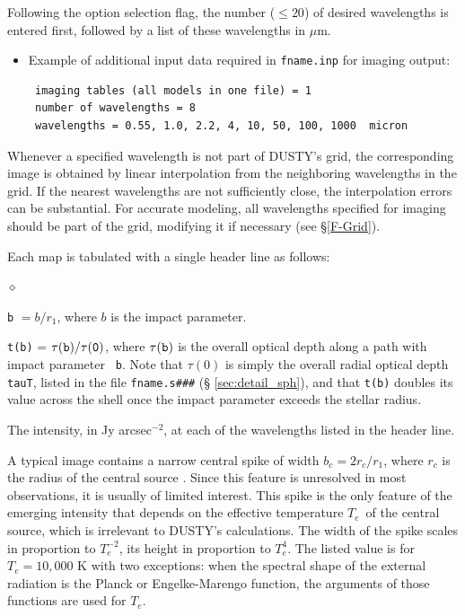 \documentclass[11pt]{article}
\def\D    {{\sf DUSTY}}
\def\mic    {\hbox{$\mu$m}}
\def\Te   {\hbox{$T_e$}}
\begin{document}
Following the option selection flag, the number ($\le 20$) of desired
wavelengths is entered first, followed by a list of these wavelengths
in \mic.

\begin{itemize}
\item Example of additional input data required in {\tt fname.inp} for
  imaging output:
\begin{verbatim}
 imaging tables (all models in one file) = 1
 number of wavelengths = 8
 wavelengths = 0.55, 1.0, 2.2, 4, 10, 50, 100, 1000  micron
\end{verbatim}
\end{itemize}
Whenever a specified wavelength is not part of \D's grid, the
corresponding image is obtained by linear interpolation from the
neighboring wavelengths in the grid.  If the nearest wavelengths are
not sufficiently close, the interpolation errors can be
substantial. For accurate modeling, all wavelengths specified for
imaging should be part of the grid, modifying it if necessary (see
\S\ref{F-Grid}).

Each map is tabulated with a single header line as follows:
\begin{list}{$\diamond$}{}
\item{\tt b} $= b/r_1$, where $b$ is the impact parameter.
\item {\tt t(b)} = $\tau(\tt b)/\tau(0)$, where $\tau(\tt b)$ is the
  overall optical depth along a path with impact parameter {\tt
    b}. Note that $\tau(0)$ is simply the overall radial optical depth
  {\tt tauT}, listed in the file {\tt fname.s\#\#\#} (\S
  \ref{sec:detail_sph}), and that {\tt t(b)} doubles its value across
  the shell once the impact parameter exceeds the stellar radius.
\item The intensity, in Jy arcsec$^{-2}$, at each of the wavelengths
  listed in the header line.
\end{list}

A typical image contains a narrow central spike of width $b_c =
2r_c/r_1$, where $r_c$ is the radius of the central source
\cite{IE96a}.  Since this feature is unresolved in most observations,
it is usually of limited interest.  This spike is the only feature of
the emerging intensity that depends on the effective temperature \Te\
of the central source, which is irrelevant to \D's calculations. The
width of the spike scales in proportion to $T_e^{-2}$, its height in
proportion to $T_e^4$. The listed value is for $T_e = 10,000$ K with
two exceptions: when the spectral shape of the external radiation is
the Planck or Engelke-Marengo function, the arguments of those
functions are used for $T_e$.
\end{document}
